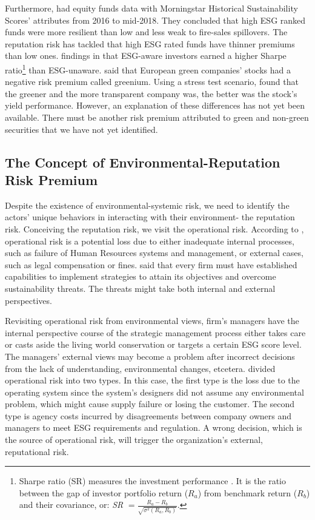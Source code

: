 \documentclass[sn-basic]{sn-jnl}%
\theoremstyle{thmstyleone}%
\theoremstyle{thmstyletwo}%
\theoremstyle{thmstylethree}%
\begin{document}
Furthermore, \citet{cerqueti2021esg} had equity funds data with Morningstar Historical Sustainability Scores’ attributes from 2016 to mid-2018. They concluded that high ESG ranked funds were more resilient than low and less weak to fire-sales spillovers. The reputation risk has tackled that high ESG rated funds have thinner premiums than low ones. \citeauthor{pedersen2020responsible} findings in \citeyear{pedersen2020responsible} that ESG-aware investors earned a higher Sharpe ratio\footnote{Sharpe ratio (SR) measures the investment performance \citep{sharpe1964equilibrium}. It is the ratio between the gap of investor portfolio return ($R_a$) from benchmark return ($R_b$) and their covariance, or: \emph{SR} $=\frac{R_a-R_b}{\sqrt{\sigma^2\left(R_a,R_b\right)}}$.} than ESG-unaware. \citet{alessi2021greenium} said that European green companies’ stocks had a negative risk premium called greenium. Using a stress test scenario, \citeauthor{alessi2021greenium} found that the greener and the more transparent company was, the better was the stock’s yield performance. However, an explanation of these differences has not yet been available. There must be another risk premium attributed to green and non-green securities that we have not yet identified.

\subsection{The Concept of Environmental-Reputation Risk Premium}
Despite the existence of environmental-systemic risk, we need to identify the actors' unique behaviors in interacting with their environment- the reputation risk. Conceiving the reputation risk, we visit the operational risk. According to \citet{solvency2007glossary}, operational risk is a potential loss due to either inadequate internal processes, such as failure of Human Resources systems and management, or external cases, such as legal compensation or fines. \cite{radomska2014operational} said that every firm must have established capabilities to implement strategies to attain its objectives and overcome sustainability threats. The threats might take both internal and external perspectives.

Revisiting operational risk from environmental views, firm’s managers have the internal perspective course of the strategic management process either takes care or casts aside the living world conservation or targets a certain ESG score level. The managers' external views may become a problem after incorrect decisions from the lack of understanding, environmental changes, etcetera. \citet{jarrow2008operational} divided operational risk into two types. In this case, the first type is the loss due to the operating system since the system’s designers did not assume any environmental problem, which might cause supply failure or losing the customer. The second type is agency costs incurred by disagreements between company owners and managers to meet ESG requirements and regulation. A wrong decision, which is the source of operational risk, will trigger the organization’s external, reputational risk.
\end{document}
